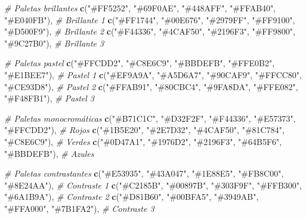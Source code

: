 \documentclass[
]{article}
\newenvironment{Shaded}{\begin{snugshade}}{\end{snugshade}}
\newcommand{\CommentTok}[1]{\textcolor[rgb]{0.56,0.35,0.01}{\textit{#1}}}
\newcommand{\FunctionTok}[1]{\textcolor[rgb]{0.13,0.29,0.53}{\textbf{#1}}}
\newcommand{\NormalTok}[1]{#1}
\newcommand{\StringTok}[1]{\textcolor[rgb]{0.31,0.60,0.02}{#1}}
\begin{document}
\begin{Shaded}
\begin{Highlighting}[]
  \CommentTok{\# Paletas brillantes}
  \FunctionTok{c}\NormalTok{(}\StringTok{"\#FF5252"}\NormalTok{, }\StringTok{"\#69F0AE"}\NormalTok{, }\StringTok{"\#448AFF"}\NormalTok{, }\StringTok{"\#FFAB40"}\NormalTok{, }\StringTok{"\#E040FB"}\NormalTok{),  }\CommentTok{\# Brillante 1}
  \FunctionTok{c}\NormalTok{(}\StringTok{"\#FF1744"}\NormalTok{, }\StringTok{"\#00E676"}\NormalTok{, }\StringTok{"\#2979FF"}\NormalTok{, }\StringTok{"\#FF9100"}\NormalTok{, }\StringTok{"\#D500F9"}\NormalTok{),  }\CommentTok{\# Brillante 2}
  \FunctionTok{c}\NormalTok{(}\StringTok{"\#F44336"}\NormalTok{, }\StringTok{"\#4CAF50"}\NormalTok{, }\StringTok{"\#2196F3"}\NormalTok{, }\StringTok{"\#FF9800"}\NormalTok{, }\StringTok{"\#9C27B0"}\NormalTok{),  }\CommentTok{\# Brillante 3}

  \CommentTok{\# Paletas pastel}
  \FunctionTok{c}\NormalTok{(}\StringTok{"\#FFCDD2"}\NormalTok{, }\StringTok{"\#C8E6C9"}\NormalTok{, }\StringTok{"\#BBDEFB"}\NormalTok{, }\StringTok{"\#FFE0B2"}\NormalTok{, }\StringTok{"\#E1BEE7"}\NormalTok{),  }\CommentTok{\# Pastel 1}
  \FunctionTok{c}\NormalTok{(}\StringTok{"\#EF9A9A"}\NormalTok{, }\StringTok{"\#A5D6A7"}\NormalTok{, }\StringTok{"\#90CAF9"}\NormalTok{, }\StringTok{"\#FFCC80"}\NormalTok{, }\StringTok{"\#CE93D8"}\NormalTok{),  }\CommentTok{\# Pastel 2}
  \FunctionTok{c}\NormalTok{(}\StringTok{"\#FFAB91"}\NormalTok{, }\StringTok{"\#80CBC4"}\NormalTok{, }\StringTok{"\#9FA8DA"}\NormalTok{, }\StringTok{"\#FFE082"}\NormalTok{, }\StringTok{"\#F48FB1"}\NormalTok{),  }\CommentTok{\# Pastel 3}

  \CommentTok{\# Paletas monocromáticas}
  \FunctionTok{c}\NormalTok{(}\StringTok{"\#B71C1C"}\NormalTok{, }\StringTok{"\#D32F2F"}\NormalTok{, }\StringTok{"\#F44336"}\NormalTok{, }\StringTok{"\#E57373"}\NormalTok{, }\StringTok{"\#FFCDD2"}\NormalTok{),  }\CommentTok{\# Rojos}
  \FunctionTok{c}\NormalTok{(}\StringTok{"\#1B5E20"}\NormalTok{, }\StringTok{"\#2E7D32"}\NormalTok{, }\StringTok{"\#4CAF50"}\NormalTok{, }\StringTok{"\#81C784"}\NormalTok{, }\StringTok{"\#C8E6C9"}\NormalTok{),  }\CommentTok{\# Verdes}
  \FunctionTok{c}\NormalTok{(}\StringTok{"\#0D47A1"}\NormalTok{, }\StringTok{"\#1976D2"}\NormalTok{, }\StringTok{"\#2196F3"}\NormalTok{, }\StringTok{"\#64B5F6"}\NormalTok{, }\StringTok{"\#BBDEFB"}\NormalTok{),  }\CommentTok{\# Azules}

  \CommentTok{\# Paletas contrastantes}
  \FunctionTok{c}\NormalTok{(}\StringTok{"\#E53935"}\NormalTok{, }\StringTok{"\#43A047"}\NormalTok{, }\StringTok{"\#1E88E5"}\NormalTok{, }\StringTok{"\#FB8C00"}\NormalTok{, }\StringTok{"\#8E24AA"}\NormalTok{),  }\CommentTok{\# Contraste 1}
  \FunctionTok{c}\NormalTok{(}\StringTok{"\#C2185B"}\NormalTok{, }\StringTok{"\#00897B"}\NormalTok{, }\StringTok{"\#303F9F"}\NormalTok{, }\StringTok{"\#FFB300"}\NormalTok{, }\StringTok{"\#6A1B9A"}\NormalTok{),  }\CommentTok{\# Contraste 2}
  \FunctionTok{c}\NormalTok{(}\StringTok{"\#D81B60"}\NormalTok{, }\StringTok{"\#00BFA5"}\NormalTok{, }\StringTok{"\#3949AB"}\NormalTok{, }\StringTok{"\#FFA000"}\NormalTok{, }\StringTok{"\#7B1FA2"}\NormalTok{),  }\CommentTok{\# Contraste 3}


\end{Highlighting}
\end{Shaded}
\end{document}
